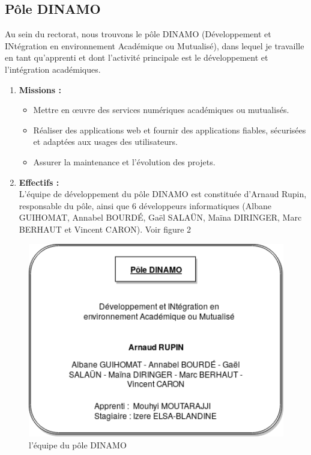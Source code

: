 \documentclass[12pt]{article}
\begin{document}
\subsection{Pôle DINAMO}

Au sein du rectorat, nous trouvons le pôle DINAMO (Développement et INtégration en environnement Académique ou Mutualisé), dans lequel je travaille en tant qu'apprenti et dont l'activité principale est le développement et l'intégration académiques. 


\begin{enumerate}
\item \textbf{Missions :}\\

\begin{itemize}
\item  Mettre en œuvre des services numériques académiques ou mutualisés.
\item  Réaliser des applications web et fournir des applications fiables, sécurisées et adaptées aux usages des utilisateurs. 
\item  Assurer la maintenance et l'évolution des projets.\\
\end{itemize}

\item \textbf{Effectifs :}\\
L’équipe de développement du pôle DINAMO est constituée d’Arnaud Rupin, responsable du pôle, ainsi que 6 développeurs informatiques (Albane GUIHOMAT, Annabel BOURDÉ, Gaël SALAÜN, Maïna DIRINGER, Marc BERHAUT et Vincent CARON). Voir figure 2\\

\end{enumerate}

\begin{figure}[H]
	\centering
 		\includegraphics[width=1\textwidth]{diagrammes/PoleDinamo.png}
  		\caption{l'équipe du pôle DINAMO}
	\end{figure}
\end{document}
